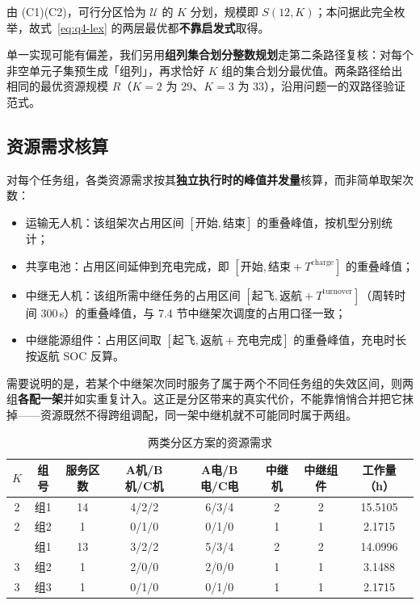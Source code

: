 由 (C1)(C2)，可行分区恰为 $\mathcal{U}$ 的 $K$ 分划，规模即 $S(12,K)$；本问据此完全枚举，故式~\eqref{eq:q4-lex} 的两层最优都\textbf{不靠启发式}取得。

单一实现可能有偏差，我们另用\textbf{组列集合划分整数规划}走第二条路径复核：对每个非空单元子集预生成「组列」，再求恰好 $K$ 组的集合划分最优值。两条路径给出相同的最优资源规模 $R$（$K=2$ 为 29、$K=3$ 为 33），沿用问题一的双路径验证范式。

\subsection{资源需求核算}

对每个任务组，各类资源需求按其\textbf{独立执行时的峰值并发量}核算，而非简单取架次数：

\begin{itemize}
	\item 运输无人机：该组架次占用区间 $[\text{开始},\text{结束}]$ 的重叠峰值，按机型分别统计；
	\item 共享电池：占用区间延伸到充电完成，即 $[\text{开始},\text{结束}+T^{\text{charge}}]$ 的重叠峰值；
	\item 中继无人机：该组所需中继任务的占用区间 $[\text{起飞},\text{返航}+T^{\text{turnover}}]$（周转时间 $300$\,s）的重叠峰值，与 7.4 节中继架次调度的占用口径一致；
	\item 中继能源组件：占用区间取 $[\text{起飞},\text{返航}+\text{充电完成}]$ 的重叠峰值，充电时长按返航 SOC 反算。
\end{itemize}

需要说明的是，若某个中继架次同时服务了属于两个不同任务组的失效区间，则两组\textbf{各配一架}并如实重复计入。这正是分区带来的真实代价，不能靠悄悄合并把它抹掉——资源既然不得跨组调配，同一架中继机就不可能同时属于两组。

\begin{table}[htbp]
	\caption{两类分区方案的资源需求}
	\label{tab:q4-partition}
	\centering
	\small
	\begin{tabular}{cccccccc}
		\toprule
		$K$ & 组号 & 服务区数 & A机/B机/C机 & A电/B电/C电 & 中继机 & 中继组件 & 工作量（h） \\
		\midrule
		2 & 组1 & 14 & 4/2/2 & 6/3/4 & 2 & 2 & 15.5105 \\
		2 & 组2 & 1  & 0/1/0 & 0/1/0 & 1 & 1 & 2.1715 \\
		\addlinespace
		3 & 组1 & 13 & 3/2/2 & 5/3/4 & 2 & 2 & 14.0996 \\
		3 & 组2 & 1  & 2/0/0 & 2/0/0 & 1 & 1 & 3.1488 \\
		3 & 组3 & 1  & 0/1/0 & 0/1/0 & 1 & 1 & 2.1715 \\
		\bottomrule
	\end{tabular}
\end{table}

